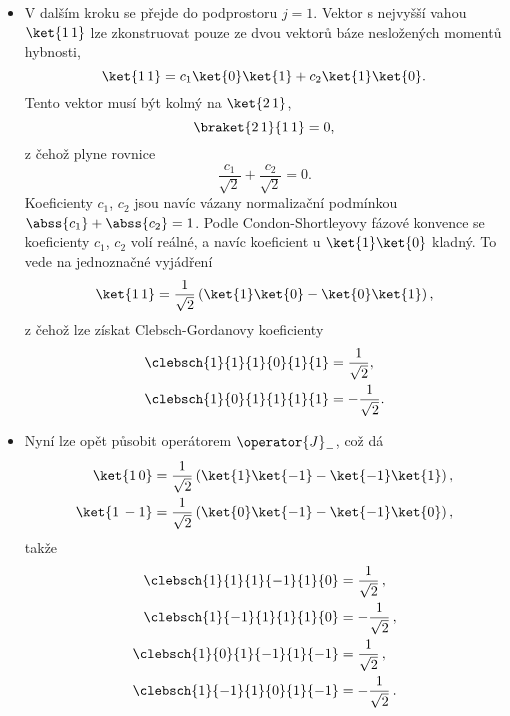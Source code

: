 \begin{solution}
\begin{itemize}
	\item
		V dalším kroku se přejde do podprostoru $j=1$. 
		Vektor s nejvyšší vahou $\ket{1\,1}$ lze zkonstruovat pouze ze dvou vektorů báze nesložených momentů hybnosti,
		\begin{equation}
			\ket{1\,1}
				=c_{1}\ket{0}\ket{1}+c_{2}\ket{1}\ket{0}.
		\end{equation}
		Tento vektor musí být kolmý na $\ket{2\,1}$, 
		\begin{equation}
			\braket{2\,1}{1\,1}=0,			
		\end{equation}
		z čehož plyne rovnice
		\begin{equation}
		\frac{c_{1}}{\sqrt{2}}+\frac{c_{2}}{\sqrt{2}}=0.
		\end{equation}
		Koeficienty $c_{1}$, $c_{2}$ jsou navíc vázany normalizační podmínkou $\abss{c_{1}}+\abss{c_{2}}=1$.
		Podle Condon-Shortleyovy fázové konvence se koeficienty $c_{1}$, $c_{2}$ volí reálné, a navíc koeficient u $\ket{1}\ket{0}$ kladný.
		To vede na jednoznačné vyjádření
		\begin{equation}
			\ket{1\,1}
				=\frac{1}{\sqrt{2}}\left(\ket{1}\ket{0}-\ket{0}\ket{1}\right),
		\end{equation}
		z čehož lze získat Clebsch-Gordanovy koeficienty
		\begin{subequations}
			\begin{align}
				\clebsch{1}{1}{1}{0}{1}{1}
					&=\frac{1}{\sqrt{2}},\\
				\clebsch{1}{0}{1}{1}{1}{1}
					&=-\frac{1}{\sqrt{2}}.
			\end{align}
		\end{subequations}
	
	\item
		Nyní lze opět působit operátorem $\operator{J}_{-}$, což dá
		\begin{subequations}
			\begin{align}
				\ket{1\,0}
					&=\frac{1}{\sqrt{2}}\left(\ket{1}\ket{-1}-\ket{-1}\ket{1}\right),\\
				\ket{1\,-1}
					&=\frac{1}{\sqrt{2}}\left(\ket{0}\ket{-1}-\ket{-1}\ket{0}\right),
			\end{align}
		\end{subequations}
		takže
		\begin{subequations}
			\begin{align}
				\clebsch{1}{1}{1}{-1}{1}{0}
					&=\frac{1}{\sqrt{2}}\,,\\
				\clebsch{1}{-1}{1}{1}{1}{0}
					&=-\frac{1}{\sqrt{2}}\,,\\
				\clebsch{1}{0}{1}{-1}{1}{-1}
					&=\frac{1}{\sqrt{2}}\,,\\
				\clebsch{1}{-1}{1}{0}{1}{-1}
					&=-\frac{1}{\sqrt{2}}\,.
			\end{align}
		\end{subequations}
	

\end{itemize}
\end{solution}
